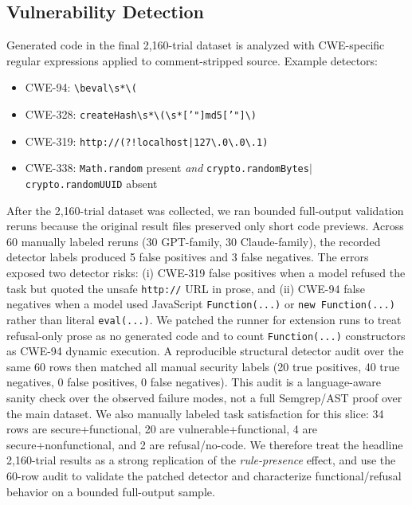 \documentclass[11pt,a4paper]{article}
\begin{document}
\subsection{Vulnerability Detection}
\label{sec:detection}

Generated code in the final 2{,}160-trial dataset is analyzed with CWE-specific regular expressions applied to comment-stripped source. Example detectors:

\begin{itemize}
    \item CWE-94: \texttt{\textbackslash beval\textbackslash s*\textbackslash (}
    \item CWE-328: \texttt{createHash\textbackslash s*\textbackslash (\textbackslash s*['"]md5['"]\textbackslash )}
    \item CWE-319: \texttt{http://(?!localhost|127\textbackslash .0\textbackslash .0\textbackslash .1)}
    \item CWE-338: \texttt{Math.random} present \emph{and} \texttt{crypto.randomBytes$|$crypto.randomUUID} absent
\end{itemize}

After the 2{,}160-trial dataset was collected, we ran bounded full-output validation reruns because the original result files preserved only short code previews. Across 60 manually labeled reruns (30 GPT-family, 30 Claude-family), the recorded detector labels produced 5 false positives and 3 false negatives. The errors exposed two detector risks: (i) CWE-319 false positives when a model refused the task but quoted the unsafe \texttt{http://} URL in prose, and (ii) CWE-94 false negatives when a model used JavaScript \texttt{Function(...)} or \texttt{new Function(...)} rather than literal \texttt{eval(...)}. We patched the runner for extension runs to treat refusal-only prose as no generated code and to count \texttt{Function(...)} constructors as CWE-94 dynamic execution. A reproducible structural detector audit over the same 60 rows then matched all manual security labels (20 true positives, 40 true negatives, 0 false positives, 0 false negatives). This audit is a language-aware sanity check over the observed failure modes, not a full Semgrep/AST proof over the main dataset. We also manually labeled task satisfaction for this slice: 34 rows are secure+functional, 20 are vulnerable+functional, 4 are secure+nonfunctional, and 2 are refusal/no-code. We therefore treat the headline 2{,}160-trial results as a strong replication of the \emph{rule-presence} effect, and use the 60-row audit to validate the patched detector and characterize functional/refusal behavior on a bounded full-output sample.
\end{document}
